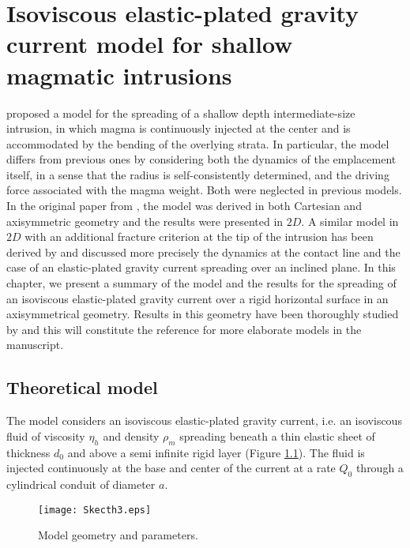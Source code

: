 \chapter[Isoviscous elastic-plated  gravity current]{Isoviscous elastic-plated  gravity current model  for shallow
  magmatic intrusions}

\label{chap2} 
\minitoc

\citet{Michaut:2011kg} proposed a model for the spreading of a shallow
depth  intermediate-size intrusion,  in  which  magma is  continuously
injected  at the  center and  is accommodated  by the  bending of  the
overlying strata.  In particular, the model differs from previous ones
by considering both the dynamics of the emplacement itself, in a sense
that the radius is self-consistently determined, and the driving force
associated with  the magma  weight.  Both  were neglected  in previous
models.  In the original  paper from \citet{Michaut:2011kg}, the model
was  derived  in both  Cartesian  and  axisymmetric geometry  and  the
results  were presented  in $2D$.   A similar  model in  $2D$ with  an
additional fracture  criterion at  the tip of  the intrusion  has been
derived   by   \citet{Bunger:2011cb}  and   \citet{Anonymous:QWXp_4JV}
discussed more precisely the dynamics at the contact line and the case
of an elastic-plated gravity current spreading over an inclined plane.
In this chapter, we present a summary of the model and the results for
the spreading of  an isoviscous elastic-plated gravity  current over a
rigid horizontal  surface in  an axisymmetrical geometry.   Results in
this geometry  have been  thoroughly studied  by \citet{Lister:2013ia}
and this  will constitute the  reference for more elaborate  models in
the manuscript.

\section{Theoretical model}
\label{C2-sec:model}

The model considers an isoviscous elastic-plated gravity current, i.e.
an  isoviscous  fluid  of  viscosity  $\eta_h$  and  density  $\rho_m$
spreading beneath a thin elastic sheet  of thickness $d_0$ and above a
semi infinite rigid layer \citep{Michaut:2011kg,Bunger:2011cb} (Figure
\ref{C2-Sketch}).  The fluid is injected  continuously at the base and
center of the current at a rate $Q_0$ through a cylindrical conduit of
diameter $a$.

\begin{figure}[h!]
  \begin{center}
    \graphicspath{ {/Users/thorey/Documents/These/Manuscript/Figure/Chapter2/} }
    \texttt{[image: Skecth3.eps]}
    \caption{Model geometry and parameters.}
    \label{C2-Sketch}
  \end{center}
\end{figure}

